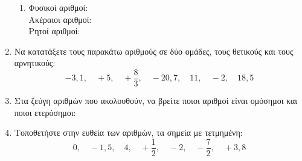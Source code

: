 \documentclass[12pt,a4page]{article}
\def\dotDeviation{-0.5ex}
\def\dotNoForWord{35}
\begin{document}
\begin{enumerate}[\bf\large 1.]
\begin{enumerate}[\bf (a)]
  \item Φυσικοί αριθμοί: \lowerdots[\dotDeviation]{\dotNoForWord} \\
    \noindent Ακέραιοι αριθμοί: \lowerdots[\dotDeviation]{\dotNoForWord} \\
    \noindent Ρητοί αριθμοί: \lowerdots[\dotDeviation]{\dotNoForWord}
  \end{enumerate}
\item Να κατατάξετε τους παρακάτω αριθμούς σε δύο ομάδες, τους θετικούς και τους αρνητικούς:
  $$-3,\!1,\quad +5,\quad +\frac83,\quad -20,\!7,\quad 11,\quad -2, \quad 18,\!5$$
\item Στα ζεύγη αριθμών που ακολουθούν, να βρείτε ποιοι αριθμοί είναι ομόσημοι και ποιοι ετερόσημοι:
  \begin{center}
  \end{center}
\item Τοποθετήστε στην ευθεία των αριθμών, τα σημεία με τετμημένη:
  $$0,\quad -1,\!5,\quad 4,\quad +\frac12,\quad -2,\quad -\frac72,\quad +3,\!8$$
  \solution{%

}
\end{enumerate}
\end{document}
